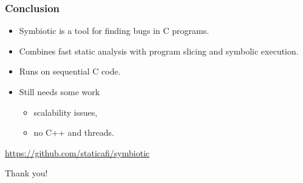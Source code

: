 \documentclass[sans]{beamer}
\begin{document}
\begin{frame}
\frametitle{Conclusion}
\begin{itemize}
  \item Symbiotic is a tool for finding bugs in C programs.
  \item Combines fast static analysis with program slicing and symbolic execution.
  \item Runs on sequential C code.
  \item Still needs some work
  \begin{itemize}
    \item scalability issues,
    \item no C++ and threads.
  \end{itemize}
\end{itemize}

\pause
\bigskip
\begin{center}
\url{https://github.com/staticafi/symbiotic}
\end{center}
\bigskip
\hfill Thank you!


\end{frame}
\end{document}

